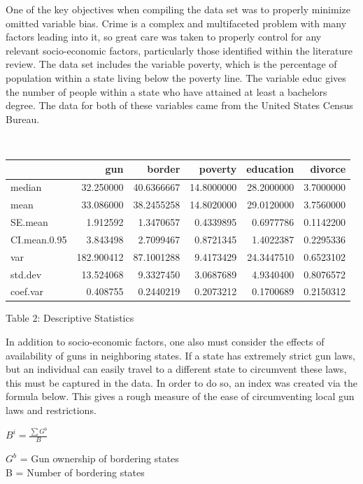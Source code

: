 \documentclass[floatsintext,mask,man]{apa6}
\theoremstyle{definition}
\theoremstyle{definition}
\theoremstyle{definition}
\theoremstyle{remark}
\begin{document}
One of the key objectives when compiling the data set was to properly
minimize omitted variable bias. Crime is a complex and multifaceted
problem with many factors leading into it, so great care was taken to
properly control for any relevant socio-economic factors, particularly
those identified within the literature review. The data set includes the
variable poverty, which is the percentage of population within a state
living below the poverty line. The variable educ gives the number of
people within a state who have attained at least a bachelors degree. The
data for both of these variables came from the United States Census
Bureau.

~

\begin{tabular}{l|r|r|r|r|r}
\hline
  & gun & border & poverty & education & divorce\\
\hline
median & 32.250000 & 40.6366667 & 14.8000000 & 28.2000000 & 3.7000000\\
\hline
mean & 33.086000 & 38.2455258 & 14.8020000 & 29.0120000 & 3.7560000\\
\hline
SE.mean & 1.912592 & 1.3470657 & 0.4339895 & 0.6977786 & 0.1142200\\
\hline
CI.mean.0.95 & 3.843498 & 2.7099467 & 0.8721345 & 1.4022387 & 0.2295336\\
\hline
var & 182.900412 & 87.1001288 & 9.4173429 & 24.3447510 & 0.6523102\\
\hline
std.dev & 13.524068 & 9.3327450 & 3.0687689 & 4.9340400 & 0.8076572\\
\hline
coef.var & 0.408755 & 0.2440219 & 0.2073212 & 0.1700689 & 0.2150312\\
\hline
\end{tabular}

Table 2: Descriptive Statistics

In addition to socio-economic factors, one also must consider the
effects of availability of guns in neighboring states. If a state has
extremely strict gun laws, but an individual can easily travel to a
different state to circumvent these laws, this must be captured in the
data. In order to do so, an index was created via the formula below.
This gives a rough measure of the ease of circumventing local gun laws
and restrictions.

\begin{center}
$B^i=\frac{\sum G^{b}}{B}$ 
\end{center}

\(G^{b}\) = Gun ownership of bordering states\\
B = Number of bordering states
\end{document}
